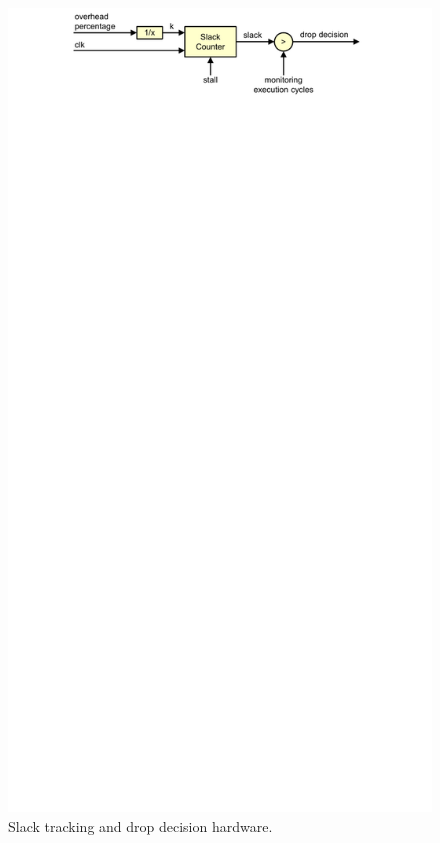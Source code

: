 \begin{figure} 
  \begin{center}
    \includegraphics{monitoring_dift_drop/figs/slack_tracking.pdf} 
    \caption{Slack tracking and drop decision hardware.}
    \label{fig:monitoring_dift_drop.policies.slack_tracking} 
  \end{center} 
\end{figure}

